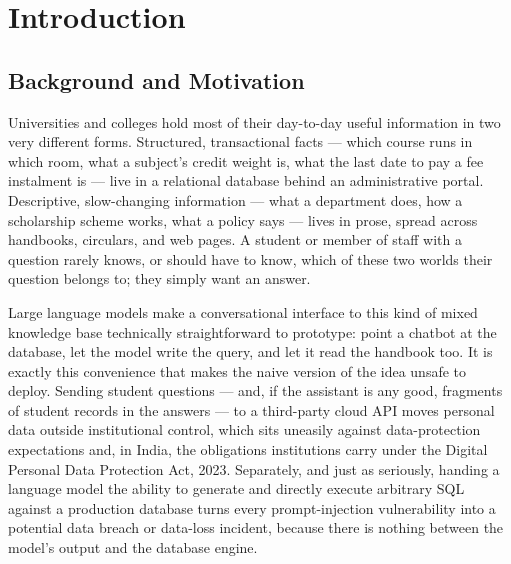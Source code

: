 \documentclass[11pt,a4paper,oneside]{report}
\begin{document}
\clearpage

\pagestyle{fancy}
\setcounter{tocdepth}{1}
\makeatletter
\renewcommand*\l@chapter[2]{%
  \ifnum \c@tocdepth >\m@ne
    \addpenalty{-\@highpenalty}%
    \vskip 0.3em \@plus\p@
    \setlength\@tempdima{1.8em}%
    \begingroup
      \parindent \z@ \rightskip \@pnumwidth \parfillskip -\@pnumwidth
      \leavevmode \bfseries
      \advance\leftskip\@tempdima
      \hskip -\leftskip
      #1\nobreak\hfil \nobreak\hbox to\@pnumwidth{\hss #2}\par
    \endgroup
  \fi}
\makeatother
\begingroup
\small
\tableofcontents
\endgroup

\clearpage
{}
\setcounter{page}{1}

\chapter{Introduction}

\section{Background and Motivation}

Universities and colleges hold most of their day-to-day useful information in
two very different forms. Structured, transactional facts --- which course
runs in which room, what a subject's credit weight is, what the last date to
pay a fee instalment is --- live in a relational database behind an
administrative portal. Descriptive, slow-changing information --- what a
department does, how a scholarship scheme works, what a policy says --- lives
in prose, spread across handbooks, circulars, and web pages. A student or
member of staff with a question rarely knows, or should have to know, which
of these two worlds their question belongs to; they simply want an answer.

Large language models make a conversational interface to this kind of mixed
knowledge base technically straightforward to prototype: point a chatbot at
the database, let the model write the query, and let it read the handbook
too. It is exactly this convenience that makes the naive version of the idea
unsafe to deploy. Sending student questions --- and, if the assistant is any
good, fragments of student records in the answers --- to a third-party cloud
API moves personal data outside institutional control, which sits uneasily
against data-protection expectations and, in India, the obligations
institutions carry under the Digital Personal Data Protection Act, 2023.
Separately, and just as seriously, handing a language model the ability to
generate and directly execute arbitrary SQL against a production database
turns every prompt-injection vulnerability into a potential data breach or
data-loss incident, because there is nothing between the model's output and
the database engine.
\end{document}
